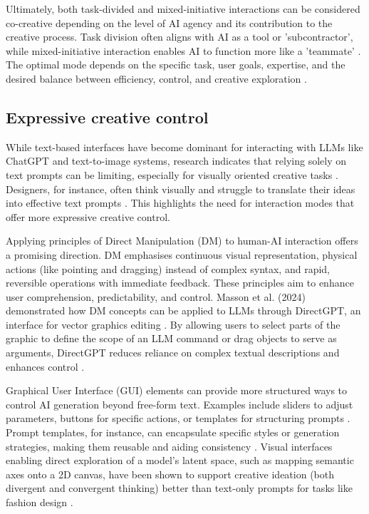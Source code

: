 Ultimately, both task-divided and mixed-initiative interactions can be considered co-creative depending on the level of AI agency and its contribution to the creative process. Task division often aligns with AI as a tool or 'subcontractor', while mixed-initiative interaction enables AI to function more like a 'teammate' \cite{Lin2023-zq}. The optimal mode depends on the specific task, user goals, expertise, and the desired balance between efficiency, control, and creative exploration \cite{Moruzzi2024-cq, Ding2024-ja, Weisz2024-io}.

\subsection{Expressive creative control}

While text-based interfaces have become dominant for interacting with LLMs like ChatGPT and text-to-image systems, research indicates that relying solely on text prompts can be limiting, especially for visually oriented creative tasks \cite{Park2024-gw, Tholander2023-rv, Verheijden2023-gn}. Designers, for instance, often think visually and struggle to translate their ideas into effective text prompts \cite{Park2024-gw, Peng2024-tr}. This highlights the need for interaction modes that offer more expressive creative control. 

Applying principles of Direct Manipulation (DM) \cite{Shneiderman1997-pu, Shneiderman1997-tv} to human-AI interaction offers a promising direction. DM emphasises continuous visual representation, physical actions (like pointing and dragging) instead of complex syntax, and rapid, reversible operations with immediate feedback. These principles aim to enhance user comprehension, predictability, and control. Masson et al. (2024) demonstrated how DM concepts can be applied to LLMs through DirectGPT, an interface for vector graphics editing \cite{Masson2024-nt}. By allowing users to select parts of the graphic to define the scope of an LLM command or drag objects to serve as arguments, DirectGPT reduces reliance on complex textual descriptions and enhances control \cite{Masson2024-nt}. 

Graphical User Interface (GUI) elements can provide more structured ways to control AI generation beyond free-form text. Examples include sliders to adjust parameters, buttons for specific actions, or templates for structuring prompts \cite{Ding2024-ta, Chang2023-tv, Moruzzi2024-cq}. Prompt templates, for instance, can encapsulate specific styles or generation strategies, making them reusable and aiding consistency \cite{Chang2023-tv}. Visual interfaces enabling direct exploration of a model's latent space, such as mapping semantic axes onto a 2D canvas, have been shown to support creative ideation (both divergent and convergent thinking) better than text-only prompts for tasks like fashion design \cite{Davis2024-ml}. 

